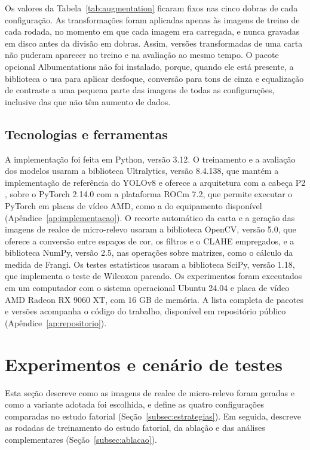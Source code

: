 \documentclass[
    12pt,                %
    openright,           %
    oneside,             %
    a4paper,             %
    english,             %
    brazil               %
]{abntex2}
\begin{document}
Os valores da Tabela~\ref{tab:augmentation} ficaram fixos nas cinco
dobras de cada configuração. As transformações foram aplicadas apenas
às imagens de treino de cada rodada, no momento em que cada imagem era
carregada, e nunca gravadas em disco antes da divisão em dobras. Assim,
versões transformadas de uma carta não puderam aparecer no treino e na
avaliação ao mesmo tempo. O pacote opcional Albumentations não foi
instalado, porque, quando ele está presente, a biblioteca o usa para
aplicar desfoque, conversão para tons de cinza e equalização de
contraste a uma pequena parte das imagens de todas as configurações,
inclusive das que não têm aumento de dados.

\subsection{Tecnologias e ferramentas}
\label{subsec:ferramentas}

A implementação foi feita em Python, versão 3.12. O treinamento e a
avaliação dos modelos usaram a biblioteca Ultralytics, versão 8.4.138,
que mantém a implementação de referência do YOLOv8 e oferece a arquitetura
com a cabeça P2 \cite{Jocher2023}, sobre o PyTorch 2.14.0 com a
plataforma ROCm 7.2, que permite executar o PyTorch em placas de vídeo
AMD, como a do equipamento disponível
(Apêndice~\ref{ap:implementacao}). O recorte automático da
carta e a geração das imagens de realce de micro-relevo usaram a
biblioteca OpenCV, versão 5.0, que oferece a conversão entre espaços de
cor, os filtros e o CLAHE empregados, e a biblioteca NumPy, versão 2.5,
nas operações sobre matrizes, como o cálculo da medida de Frangi. Os
testes estatísticos usaram a biblioteca SciPy, versão 1.18, que
implementa o teste de Wilcoxon pareado. Os experimentos foram executados em um computador
com o sistema operacional Ubuntu 24.04 e placa de vídeo AMD Radeon RX
9060 XT, com 16 GB de memória. A lista completa de pacotes e versões
acompanha o código do trabalho, disponível em repositório
público (Apêndice~\ref{ap:repositorio}).

\section{Experimentos e cenário de testes}
\label{sec:experimentos}

Esta seção descreve como as imagens de realce de micro-relevo foram
geradas e como a variante adotada foi escolhida, e define as quatro
configurações comparadas no estudo fatorial
(Seção~\ref{subsec:estrategias}). Em seguida, descreve as rodadas de
treinamento do estudo fatorial, da ablação e das análises
complementares (Seção~\ref{subsec:ablacao}).
\end{document}
